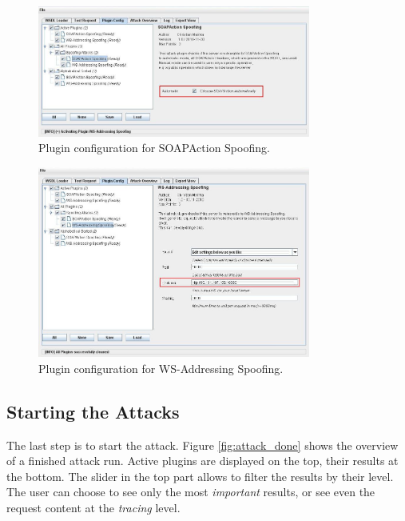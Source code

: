 \begin{figure}[h!]
    \begin{center}
        \includegraphics[width=0.8\textwidth]{img/plugin_config_sas}
    \end{center}
    \caption{Plugin configuration for SOAPAction Spoofing.}
    \label{fig:plugin_config_sas}
\end{figure}

\begin{figure}[h!]
    \begin{center}
        \includegraphics[width=0.8\textwidth]{img/plugin_config_wsas}
    \end{center}
    \caption{Plugin configuration for WS-Addressing Spoofing.}
    \label{fig:plugin_config_wsas}
\end{figure}

\subsection{Starting the Attacks}
\label{sec:starting_the_attacks}

The last step is to start the attack. Figure \ref{fig:attack_done} shows
the overview of a finished attack run. Active plugins are displayed on the top,
their results at the bottom. The slider in the top part allows to filter the
results by their level. The user can choose to see only the most
\emph{important} results, or see even the request content at the \emph{tracing}
level.

